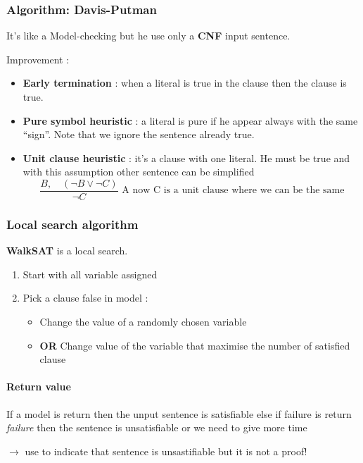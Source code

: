 \subsubsection{Algorithm: Davis-Putman}
It's like a Model-checking but he use only a \textbf{CNF} input sentence.

Improvement :
\begin{itemize}
    \item \textbf{Early termination} : when a literal is true in the clause then
        the clause is true.
    \item \textbf{Pure symbol heuristic} : a literal is pure if he appear always with
        the same ``sign''. Note that we ignore the sentence already true.
    \item \textbf{Unit clause heuristic} : it's a clause with one literal. 
        He must be true and with this assumption other sentence can be simplified
        $$ \frac{B, \quad (\neg B \vee \neg C)}{\neg C} \textrm{ A now C is a unit
        clause where we can be the same}$$
\end{itemize}

\subsubsection{Local search algorithm}
\textbf{WalkSAT} is a local search. 
\begin{enumerate}
    \item Start with all variable assigned
    \item Pick a clause false in model :
        \begin{itemize}
            \item Change the value of a randomly chosen variable 
            \item \textbf{OR} Change value of the variable that maximise
                the number of satisfied clause
        \end{itemize}
\end{enumerate}

\paragraph{Return value}
If a model is return then the unput sentence is satisfiable
else if failure is return \textit{failure} then the sentence is
unsatisfiable or we need to give more time

$\to$ use to indicate that sentence is unsastifiable but it is not a proof!

